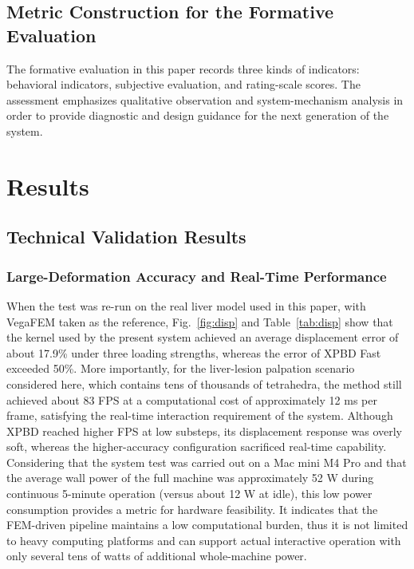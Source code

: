 \documentclass{ieeeaccess}
\providecommand{\DIFaddbegin}{} %
\providecommand{\DIFaddend}{} %
\newcommand{\DIFaddincludegraphics}[2][]{{\color{blue}\fbox{\DIFOincludegraphics[#1]{#2}}}} %
\DeclareRobustCommand{\DIFaddbegin}{\DIFOaddbegin \let\includegraphics\DIFaddincludegraphics} %
\DeclareRobustCommand{\DIFaddend}{\DIFOaddend \let\includegraphics\DIFOincludegraphics} %
\begin{document}
\subsection{Metric Construction for the Formative Evaluation}
The formative evaluation in this paper records three kinds of indicators: behavioral indicators, subjective evaluation, and rating-scale scores. The assessment emphasizes qualitative observation and system-mechanism analysis in order to provide diagnostic and design guidance for the next generation of the system.

\section{Results}
\DIFaddbegin 

\DIFaddend \subsection{Technical Validation Results}
\subsubsection{Large-Deformation Accuracy and Real-Time Performance}
When the test was re-run on the real liver model used in this paper, with VegaFEM taken as the reference, Fig.~\ref{fig:disp} and Table~\ref{tab:disp} show that the kernel used by the present system achieved an average displacement error of about 17.9\% under three loading strengths, whereas the error of XPBD Fast exceeded 50\%. More importantly, for the liver-lesion palpation scenario considered here, which contains tens of thousands of tetrahedra, the method still achieved about 83 FPS at a computational cost of approximately 12 ms per frame, satisfying the real-time interaction requirement of the system. Although XPBD reached higher FPS at low substeps, its displacement response was overly soft, whereas the higher-accuracy configuration sacrificed real-time capability. Considering that the system test was carried out on a Mac mini M4 Pro and that the average wall power of the full machine was approximately 52 W during continuous 5-minute operation (versus about 12 W at idle), this low power consumption provides a metric for hardware feasibility. It indicates that the FEM-driven pipeline maintains a low computational burden, thus it is not limited to heavy computing platforms and can support actual interactive operation with only several tens of watts of additional whole-machine power.
\end{document}
